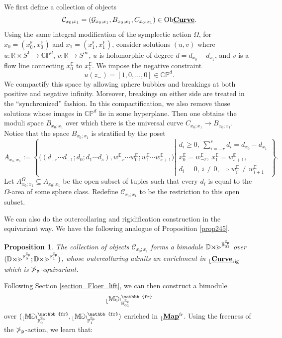 \documentclass[reqno, 10pt]{amsart}
\numberwithin{equation}{section}
\numberwithin{equation}{section}
\renewcommand{\subset}{\subseteq}
\newtheorem{prop}[thm]{Proposition}
\theoremstyle{definition}
\theoremstyle{remark}
\newcommand{\beqn}{\begin{equation*}}
\newcommand{\eeqn}{\end{equation*}}
\newcommand{\mb}{\mathbb}
\newcommand{\mc}{\mathcal}
\newcommand{\p}{{\sf p}}
\newcommand{\zp}{{{\mb Z}_{\sf p}}}
\newcommand{\ep}{{{\mathbb E}}}
\renewcommand{\outer}{{}_{\lfloor}}
\newcommand{\uds}[1]{\underline{\smash{#1}}}
\begin{document}
We first define a collection of objects
\beqn
{\mc C}_{x_0; x_1} = ({\mc G}_{x_0; x_1}, B_{x_0; x_1}, C_{x_0; x_1}) \in {\rm Ob} \uds{\bf Curve}.
\eeqn
Using the same integral modification of the symplectic action $\Omega$, for $x_0 = (x_0^{\mb F}, x_0^\ep)$ and $x_1 = (x_1^{\mb F}, x_1^\ep)$, consider solutions $(u, v)$ where $u: {\mb R} \times S^1 \to \mb{CP}^d$, $v: {\mb R} \to S^\infty$, $u$ is holomorphic of degree $d = d_{x_0} - d_{x_1}$, and $v$ is a flow line connecting $x_0^\ep$ to $x_1^\ep$. We impose the negative constraint
\beqn
u(z_-) = [1, 0, \ldots, 0] \in \mb{CP}^d.
\eeqn
We compactify this space by allowing sphere bubbles and breakings at both positive and negative infinity. Moreover, breakings on either side are treated in the ``synchronized'' fashion. In this compactification, we also remove those solutions whose images in $\mb{CP}^d$ lie in some hyperplane. Then one obtains the moduli space $B_{x_0; x_1}$ over which there is the universal curve $C_{x_0; x_1}\to B_{x_0; x_1}$. Notice that the space $B_{x_0; x_1}$ is stratified by the poset
\beqn
A_{x_0; x_1}:= \left\{\Big( (d_{-r} \cdots d_{-1}; d_0; d_1\cdots d_s), w_{-r}^\ep \cdots w_0^\ep; w_1^\ep \cdots  w_{s+1}^\ep \Big) \left| \begin{array}{c}  d_i \geq 0,\ \displaystyle \sum_{i=-r}^s d_i = d_{x_0} - d_{x_1} \\
x_0^\ep = w_{-r}^\ep,\ x_1^\ep = w_{s+1}^\ep,\\
d_i = 0,\ i \neq 0, \Longrightarrow w_i^\ep \neq w_{i+1}^\ep
\end{array} \right. \right\}.
\eeqn
Let $A_{x_0; x_1}^\Omega \subset A_{x_0; x_1}$ be the open subset of tuples such that every $d_i$ is equal to the $\Omega$-area of some sphere class. Redefine ${\mc C}_{x_0; x_1}$ to be the restriction to this open subset. 

We can also do the outercollaring and rigidification construction in the equivariant way. We have the following analogue of Proposition \ref{prop245}. 

\begin{prop}
The collection of objects ${\mc C}_{x_0; x_1}$ forms a bimodule $\mb{Dom}^{{\mb B}_{01}^{\zp}}$ over $(\mb{Dom}^{{\mb F}_0^{\zp}}; \mb{Dom}^{{\mb F}^{\zp}_1})$, whose outercollaring admits an enrichment in $\outer \uds{\bf Curve}_{\rm rig}$ which is $\mb\Pi_\p$-equivariant.
\end{prop}

Following Section \ref{section_Floer_lift}, we can then construct a bimodule 
\beqn
\outer \mb{Map}_{\mb{B}^{\zp}_{01}}^{\mb{fr}}
\eeqn
over $(\outer \mb{Map}_{\mb{F}_0^{\zp}}^{\mb{fr}}, \outer \mb{Map}_{\mb{F}^{\zp}_1}^{\mb{fr}})$ enriched in $\outer \uds{\bf Map}^{\rm fr}$. Using the freeness of the $\mb\Pi_\p$-action, we learn that:
\end{document}
